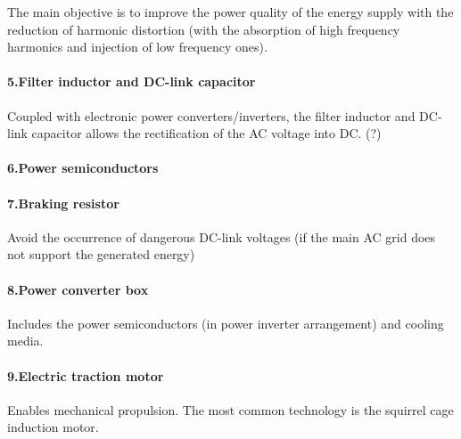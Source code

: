 	The main objective is to improve the power quality of the energy supply with the reduction of harmonic distortion (with the absorption of high frequency harmonics and injection of low frequency ones).

\paragraph{5.Filter inductor and DC-link capacitor\\}

	Coupled with electronic power converters/inverters, the filter inductor and DC-link capacitor allows the rectification of the AC voltage into DC. (?)
	
\paragraph{6.Power semiconductors\\}


\paragraph{7.Braking resistor\\}

	Avoid the occurrence of dangerous DC-link voltages (if the main AC grid does not support the generated energy)

\paragraph{8.Power converter box\\}

	Includes the power semiconductors (in power inverter arrangement) and cooling media.

\paragraph{9.Electric traction motor\\}

	Enables mechanical propulsion. The most common technology is the squirrel cage induction motor.




